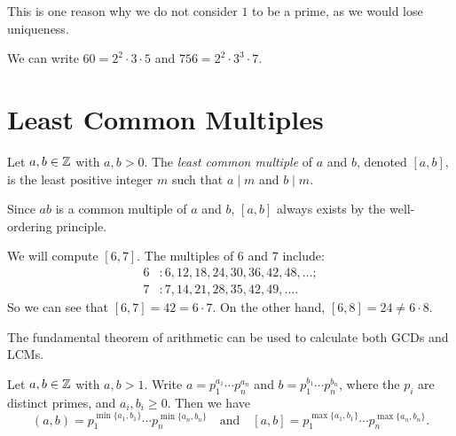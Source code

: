 \begin{remark}
  This is one reason why we do not
  consider $1$ to be a prime, as we would
  lose uniqueness.
\end{remark}

\begin{example}
  We can write $60 = 2^2 \cdot 3 \cdot 5$
  and $756 = 2^2 \cdot 3^3 \cdot 7$.
\end{example}

\section{Least Common Multiples}

\begin{definition}
  Let $a, b \in \mathbb{Z}$ with $a, b > 0$.
  The \emph{least common multiple}
  of $a$ and $b$, denoted $[a, b]$, is the
  least positive integer $m$ such that
  $a \mid m$ and $b \mid m$.
\end{definition}

\begin{remark}
  Since $ab$ is a common multiple
  of $a$ and $b$, $[a, b]$ always
  exists by the well-ordering principle.
\end{remark}

\begin{example}
  We will compute $[6, 7]$. The multiples
  of $6$ and $7$ include:
  \begin{align*}
    6 &: 6, 12, 18, 24, 30, 36, 42, 48, \dots; \\
    7 &: 7, 14, 21, 28, 35, 42, 49, \dots.
  \end{align*}
  So we can see that $[6, 7] = 42 = 6 \cdot 7$.
  On the other hand, $[6, 8] = 24 \ne 6 \cdot 8$.
\end{example}

\begin{remark}
  The fundamental theorem of arithmetic
  can be used to calculate both GCDs and
  LCMs.
\end{remark}

\begin{prop}\label{prop:gcd-lcm-prime-factorization}
  Let $a, b \in \mathbb{Z}$ with $a, b > 1$.
  Write $a = p_1^{a_1} \cdots p_n^{a_n}$
  and $b = p_1^{b_1} \cdots p_n^{b_n}$,
  where the $p_i$ are distinct primes,
  and $a_i, b_i \ge 0$. Then we have
  \[
    (a, b) = p_1^{\min\{a_1, b_1\}} \cdots p_n^{\min\{a_n, b_n\}} \quad \text{and} \quad
    [a, b] = p_1^{\max\{a_1, b_1\}} \cdots p_n^{\max\{a_n, b_n\}}.
  \]
\end{prop}

